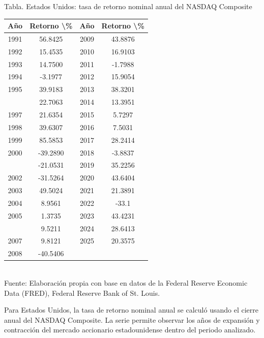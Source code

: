 \documentclass{article}\usepackage[]{graphicx}\usepackage[]{xcolor}
\begin{document}
\begin{center}
Tabla. Estados Unidos: tasa de retorno nominal anual del NASDAQ Composite
\end{center}
\begin{center}

\begin{tabular}{cccc}
\toprule
Año & Retorno \textbackslash{}\% & Año & Retorno \textbackslash{}\%\\
\midrule
1991 & 56.8425 & 2009 & 43.8876\\
1992 & 15.4535 & 2010 & 16.9103\\
1993 & 14.7500 & 2011 & -1.7988\\
1994 & -3.1977 & 2012 & 15.9054\\
1995 & 39.9183 & 2013 & 38.3201\\
\addlinespace
1996 & 22.7063 & 2014 & 13.3951\\
1997 & 21.6354 & 2015 & 5.7297\\
1998 & 39.6307 & 2016 & 7.5031\\
1999 & 85.5853 & 2017 & 28.2414\\
2000 & -39.2890 & 2018 & -3.8837\\
\addlinespace
2001 & -21.0531 & 2019 & 35.2256\\
2002 & -31.5264 & 2020 & 43.6404\\
2003 & 49.5024 & 2021 & 21.3891\\
2004 & 8.9561 & 2022 & -33.1\\
2005 & 1.3735 & 2023 & 43.4231\\
\addlinespace
2006 & 9.5211 & 2024 & 28.6413\\
2007 & 9.8121 & 2025 & 20.3575\\
2008 & -40.5406 &  & \\
\bottomrule
\end{tabular}
\\[0.3em]
{\footnotesize Fuente: Elaboración propia con base en datos de la Federal Reserve Economic Data (FRED), Federal Reserve Bank of St. Louis.}
\end{center}


Para Estados Unidos, la tasa de retorno nominal anual se calculó usando el cierre anual del NASDAQ Composite. La serie permite observar los años de expansión y contracción del mercado accionario estadounidense dentro del periodo analizado.
\end{document}
